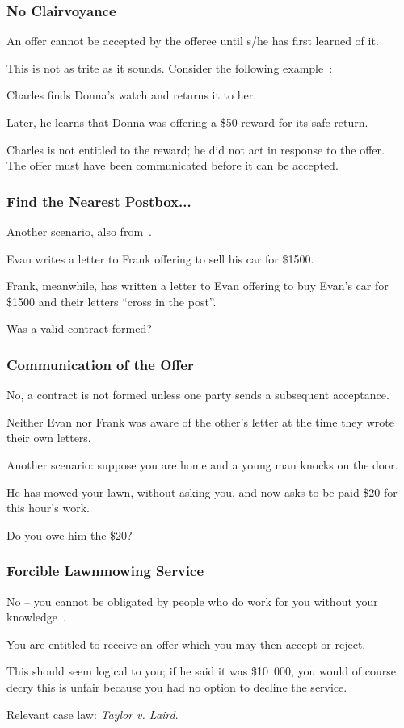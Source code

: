 \begin{frame}
\frametitle{No Clairvoyance}
An offer cannot be accepted by the offeree until s/he has first learned of it.

This is not as trite as it sounds. Consider the following example~\cite{lba}:

Charles finds Donna's watch and returns it to her.

Later, he learns that Donna was offering a \$50 reward for its safe return.

Charles is not entitled to the reward; he did not act in response to the offer.\\
\quad The offer must have been \alert{communicated} before it can be accepted.

\end{frame}



\begin{frame}
\frametitle{Find the Nearest Postbox...}

Another scenario, also from~\cite{lba}. 

Evan writes a letter to Frank offering to sell his car for \$1500.

Frank, meanwhile, has written a letter to Evan offering to buy Evan's car for \$1500 and their letters ``cross in the post''.

Was a valid contract formed?

\end{frame}



\begin{frame}
\frametitle{Communication of the Offer}

No, a contract is not formed unless one party sends a subsequent acceptance. 

Neither Evan nor Frank was aware of the other's letter at the time they wrote their own letters.

Another scenario: suppose you are home and a young man knocks on the door.

He has mowed your lawn, without asking you, and now asks to be paid \$20 for this hour's work.

Do you owe him the \$20?

\end{frame}



\begin{frame}
\frametitle{Forcible Lawnmowing Service}

No -- you cannot be obligated by people who do work for you without your knowledge~\cite{lba}.

You are entitled to receive an offer which you may then accept or reject.

This should seem logical to you; if he said it was \$10~000, you would of course decry this is unfair because you had no option to decline the service.

Relevant case law: \textit{Taylor v. Laird}.


\end{frame}

